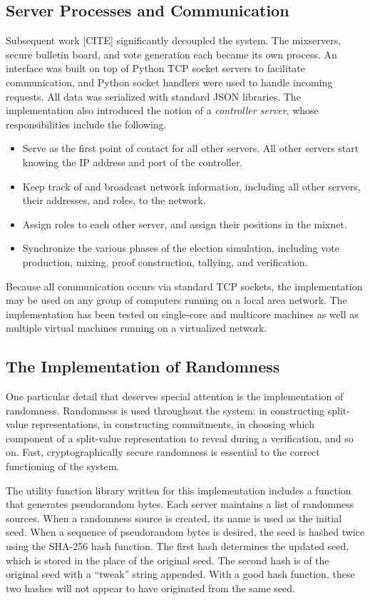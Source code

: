 \subsection{Server Processes and Communication}

Subsequent work [CITE] significantly decoupled the system. The mixservers, secure bulletin board, and vote generation each became its own process. An interface was built on top of Python TCP socket servers to facilitate communication, and Python socket handlers were used to handle incoming requests. All data was serialized with standard JSON libraries. The implementation also introduced the notion of a \emph{controller server}, whose responsibilities include the following.
\begin{itemize}
\item Serve as the first point of contact for all other servers. All other servers start knowing the IP address and port of the controller.
\item Keep track of and broadcast network information, including all other servers, their addresses, and roles, to the network.
\item Assign roles to each other server, and assign their positions in the mixnet.
\item Synchronize the various phases of the election simulation, including vote production, mixing, proof construction, tallying, and verification.
\end{itemize}

Because all communication occurs via standard TCP sockets, the implementation may be used on any group of computers running on a local area network. The implementation has been tested on single-core and multicore machines as well as multiple virtual machines running on a virtualized network.

\subsection{The Implementation of Randomness}

One particular detail that deserves special attention is the implementation of randomness. Randomness is used throughout the system: in constructing split-value representations, in constructing commitments, in choosing which component of a split-value representation to reveal during a verification, and so on. Fast, cryptographically secure randomness is essential to the correct functioning of the system.

The utility function library written for this implementation includes a function that generates pseudorandom bytes. Each server maintains a list of randomness sources. When a randomness source is created, its name is used as the initial seed. When a sequence of pseudorandom bytes is desired, the seed is hashed twice using the SHA-256 hash function. The first hash determines the updated seed, which is stored in the place of the original seed. The second hash is of the original seed with a ``tweak'' string appended. With a good hash function, these two hashes will not appear to have originated from the same seed.


